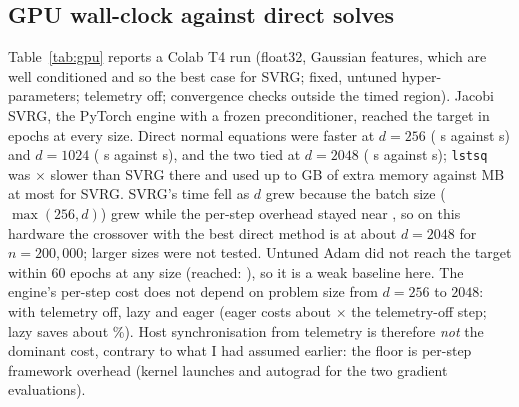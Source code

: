 \documentclass[11pt]{article}
\theoremstyle{remark}
\begin{document}
\subsection{GPU wall-clock against direct solves}\label{sec:gpu}
Table~\ref{tab:gpu} reports a Colab T4 run (float32, Gaussian features, which are well conditioned and so the best case for SVRG; fixed, untuned hyper-parameters; telemetry off; convergence checks outside the timed region). Jacobi SVRG, the PyTorch engine with a frozen preconditioner, reached the target in \GpuSvrgEpochs{} epochs at every size. Direct normal equations were faster at $d=256$ (\GpuNormalSmall{} s against \GpuSvrgSmall{} s) and $d=1024$ (\GpuNormalMid{} s against \GpuSvrgMid{} s), and the two tied at $d=2048$ (\GpuNormalLarge{} s against \GpuSvrgLarge{} s); \texttt{lstsq} was \GpuLstsqOverSvrg$\times$ slower than SVRG there and used up to \GpuLstsqMemory{} GB of extra memory against \GpuSvrgMemory{} MB at most for SVRG. SVRG's time fell as $d$ grew because the batch size ($\max(256,d)$) grew while the per-step overhead stayed near \GpuOffUs, so on this hardware the crossover with the best direct method is at about $d=2048$ for $n=200{,}000$; larger sizes were not tested. Untuned Adam did not reach the target within 60 epochs at any size (reached: \GpuAdamReached), so it is a weak baseline here.
The engine's per-step cost does not depend on problem size from $d=256$ to $2048$: \GpuOffUs{} with telemetry off, \GpuLazyUs{} lazy and \GpuEagerUs{} eager (eager costs about \GpuEagerOverOff$\times$ the telemetry-off step; lazy saves about \GpuLazySaving\%). Host synchronisation from telemetry is therefore \emph{not} the dominant cost, contrary to what I had assumed earlier: the floor is per-step framework overhead (kernel launches and autograd for the two gradient evaluations).
\end{document}
